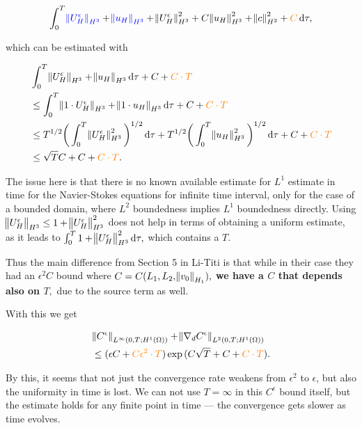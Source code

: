 \documentclass[11pt]{article}
\newcommand*\diff{\mathop{}\!\mathrm{d}}
\begin{document}
\[ \int_0^T \textcolor{blue}{\norm{U_H^\epsilon}_{H^3}} + \textcolor{blue}{\norm{u_H}_{H^3}} + \norm{U_H^\epsilon}_{H^3}^2 + C \norm{u_H}_{H^3}^2 + \norm{c}_{H^2}^2 + \textcolor{orange}{C} \diff \tau,\]

which can be estimated with

\begin{equation}
  \begin{split}
    & \int_0^T \norm{U_H^\epsilon}_{H^3} + \norm{u_H}_{H^3} \diff \tau + C + \textcolor{orange}{C \cdot T} \\
    & \leq \int_0^T \norm{1 \cdot U_H^\epsilon}_{H^3} + \norm{1 \cdot u_H}_{H^3} \diff \tau + C + \textcolor{orange}{C \cdot T}\\
    & \leq T^{1/2} \bigg (\int_0^T \norm{U_H^\epsilon}_{H^3}^2 \bigg )^{1/2} \diff \tau + T^{1/2} \bigg (\int_0^T \norm{u_H}_{H^3}^2 \bigg )^{1/2} \diff \tau + C + \textcolor{orange}{C \cdot T}\\
    & \leq \sqrt{T} C + C + \textcolor{orange}{ C \cdot T}.
  \end{split}
\end{equation}

The issue here is that there is no known available estimate for $L^1$ estimate in time for the Navier-Stokes equations for infinite time interval, only for the case of a bounded domain, where $L^2$ boundedness implies $L^1$ boundedness directly. Using $\norm{U_H^\epsilon}_{H^3} \leq 1 + \norm{U_H^\epsilon}_{H^3}^2$ does not help in terms of obtaining a uniform estimate, as it leads to $\int_0^T 1 + \norm{U_H^\epsilon}_{H^3}^2 \diff \tau,$ which contains a $T.$

Thus the main difference from Section 5 in Li-Titi is that while in their case they had an $\epsilon^2 C$ bound where $C=C(L_1, L_2, \norm{v_0}_{H_1}),$ \textbf{we have a $C$ that depends also on $T,$} due to the source term as well.

With this we get

\begin{equation}
  \begin{split}
    & \norm{C^\epsilon}_{L^\infty(0,T; H^1(\Omega))} + \norm{\nabla_d C^\epsilon}_{L^2(0,T; H^1(\Omega))} \\
    & \leq (\epsilon C + \textcolor{orange}{C \epsilon^2 \cdot T}) \exp{(C \sqrt{T} + C + \textcolor{orange}{C \cdot T})}.
  \end{split}
\end{equation}

By this, it seems that not just the convergence rate weakens from $\epsilon^2$ to $\epsilon$, but also the uniformity in time is lost. We can not use $T=\infty$ in this $C^\epsilon$ bound itself, but the estimate holds for any finite point in time --- the convergence gets slower as time evolves.
\end{document}
